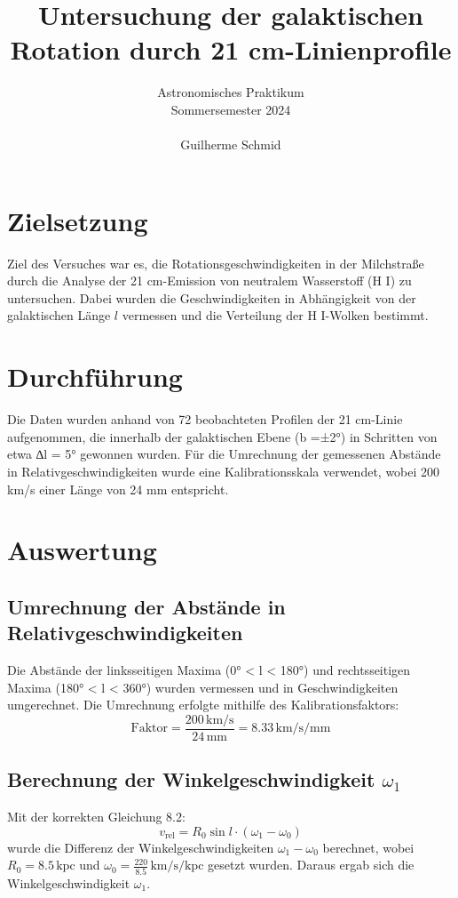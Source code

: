 \documentclass[a4paper,12pt]{article}
\title{Untersuchung der galaktischen Rotation durch 21 cm-Linienprofile}
\author{Astronomisches Praktikum \\
Sommersemester 2024\\\\
Guilherme Schmid}
\date{}
\begin{document}
\maketitle

\section*{Zielsetzung}
Ziel des Versuches war es, die Rotationsgeschwindigkeiten in der Milchstraße durch die Analyse der 21 cm-Emission von neutralem Wasserstoff (H I) zu untersuchen. Dabei wurden die Geschwindigkeiten in Abhängigkeit von der galaktischen Länge \( l \) vermessen und die Verteilung der H I-Wolken bestimmt.

\section*{Durchführung}
Die Daten wurden anhand von 72 beobachteten Profilen der 21 cm-Linie aufgenommen, die innerhalb der galaktischen Ebene (b =±2°) in Schritten von etwa ∆l = 5° gewonnen wurden. Für die Umrechnung der gemessenen Abstände in Relativgeschwindigkeiten wurde eine Kalibrationsskala verwendet, wobei 200 km/s einer Länge von 24 mm entspricht.

\section*{Auswertung}

\subsection*{Umrechnung der Abstände in Relativgeschwindigkeiten}
Die Abstände der linksseitigen Maxima (0° < l < 180°) und rechtsseitigen Maxima (180° < l < 360°) wurden vermessen und in Geschwindigkeiten umgerechnet. Die Umrechnung erfolgte mithilfe des Kalibrationsfaktors:
\[
\text{Faktor} = \frac{200 \, \text{km/s}}{24 \, \text{mm}} = 8.33 \, \text{km/s/mm}
\]

\subsection*{Berechnung der Winkelgeschwindigkeit \(\omega_1\)}
Mit der korrekten Gleichung 8.2:
\[
v_{\text{rel}} = R_0 \sin l \cdot (\omega_1 - \omega_0)
\]
wurde die Differenz der Winkelgeschwindigkeiten \( \omega_1 - \omega_0 \) berechnet, wobei \( R_0 = 8.5 \, \text{kpc} \) und \( \omega_0 = \frac{220}{8.5} \, \text{km/s/kpc} \) gesetzt wurden. Daraus ergab sich die Winkelgeschwindigkeit \( \omega_1 \).
\end{document}
